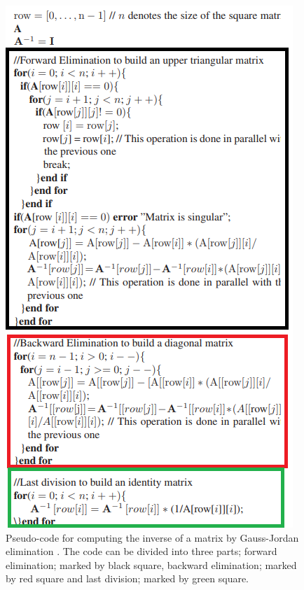 \begin{figure}[H]
\centering
   \includegraphics[scale=0.8]{images/gauss_jordan_pseudocode.png}
  \caption{ Pseudo-code for computing the inverse of a matrix by Gauss-Jordan elimination \cite{gauss_jordan_fpga}. The code can be divided into three parts; forward elimination; marked by black square, backward elimination; marked by red square and last division; marked by green square. } 
  \label{fig:gauss_jordan_pseudocode}
\end{figure}